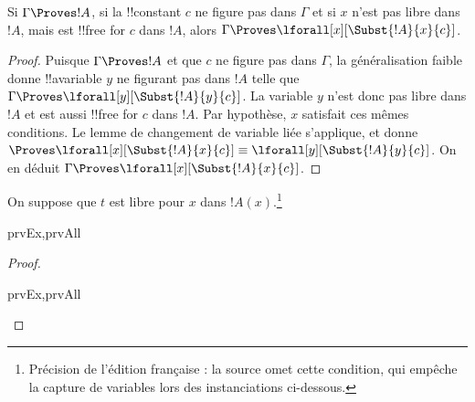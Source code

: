 \documentclass[../../../include/open-logic-section]{subfiles}
\begin{document}
\begin{thm}
Si $\Gamma\Proves !A$, si la !!{constant} $c$ ne figure pas
dans $\Gamma$ et si $x$ n'est pas libre dans $!A$, mais est
!!{free for} $c$ dans $!A$, alors
$\Gamma\Proves\lforall[x][\Subst{!A}{x}{c}]$.
\end{thm}

\begin{proof}
Puisque $\Gamma\Proves !A$ et que $c$ ne figure pas dans
$\Gamma$, la généralisation faible donne !!a{variable} $y$
ne figurant pas dans $!A$ telle que
$\Gamma\Proves\lforall[y][\Subst{!A}{y}{c}]$.
La variable $y$ n'est donc pas libre dans $!A$ et est aussi
!!{free for} $c$ dans $!A$. Par hypothèse, $x$ satisfait ces
mêmes conditions. Le lemme de changement de variable liée
s'applique, et donne
$\Proves\lforall[x][\Subst{!A}{x}{c}]
\equiv\lforall[y][\Subst{!A}{y}{c}]$.
On en déduit $\Gamma\Proves\lforall[x][\Subst{!A}{x}{c}]$.
\end{proof}

\begin{thm}
On suppose que $t$ est libre pour $x$ dans $!A(x)$.\footnote{
Précision de l'édition française : la source omet cette
condition, qui empêche la capture de variables lors des
instanciations ci-dessous.}
\begin{tagenumerate}{prvEx,prvAll}
\end{tagenumerate}
\end{thm}

\begin{proof}
\begin{tagenumerate}{prvEx,prvAll}
\end{tagenumerate}
\end{proof}
\end{document}

